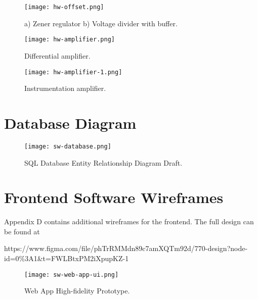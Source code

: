 \begin{figure}[!ht]
	\centering
	\texttt{[image: hw-offset.png]}
	\caption{a) Zener regulator b) Voltage divider with buffer.}
	\label{fig:offset}
\end{figure}

\begin{figure}[!ht]
	\centering
	\texttt{[image: hw-amplifier.png]}
	\caption{Differential amplifier.}
	\label{fig:amplifier}
\end{figure}

\begin{figure}[!ht]
	\centering
	\texttt{[image: hw-amplifier-1.png]}
	\caption{Instrumentation amplifier.}
	\label{fig:amplifier-2}
\end{figure}


\chapter{Database Diagram}

\begin{figure}[!ht]
	\centering
	\texttt{[image: sw-database.png]}
	\caption{SQL Database Entity Relationship Diagram Draft.}
	\label{fig:database-1}
\end{figure}

\chapter{Frontend Software Wireframes}

Appendix D contains additional wireframes for the frontend. The full design can be found at

   https://www.figma.com/file/phTrRMMdn89c7amXQTm92d/770-design?node-id=0\%3A1\&t=FWLBtxPM2iXpupKZ-1

\begin{figure}[!ht]
	\centering
	\texttt{[image: sw-web-app-ui.png]}
	\caption{Web App High-fidelity Prototype.}
	\label{fig:webapp-1}
\end{figure}



